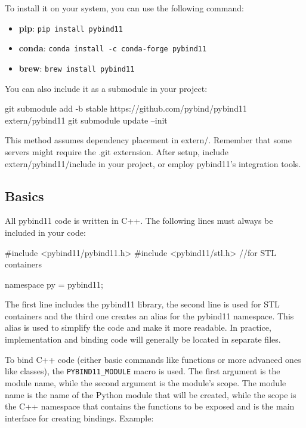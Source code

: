To install it on your system, you can use the following command:

\begin{itemize}
    \item \textbf{pip}: \phantom{wcoi} \texttt{pip install pybind11}

    \item \textbf{conda}: \phantom{w} \texttt{conda install -c conda-forge pybind11}

    \item \textbf{brew}: \phantom {da.} \texttt{brew install pybind11}

\end{itemize}

You can also include it as a submodule in your project:

\begin{codeblock}[language=bash]
git submodule add -b stable https://github.com/pybind/pybind11 extern/pybind11
git submodule update --init 
\end{codeblock}

This method assumes dependency placement in extern/. Remember that some servers might require the .git externsion.
After setup, include extern/pybind11/include in your project, or employ pybind11's integration tools.

\subsection{Basics}

All pybind11 code is written in C++. The following lines must always be included in your code:

\begin{codeblock}[language=C++]
#include <pybind11/pybind11.h> 
#include <pybind11/stl.h> //for STL containers

namespace py = pybind11;
\end{codeblock}

The first line includes the pybind11 library, the second line is used for STL containers and the third one creates an alias for the pybind11 namespace. This alias is used to simplify the code and make it more readable.
In practice, implementation and binding code will generally be located in separate files.

To bind C++ code (either basic commands like functions or more advanced ones like classes), the \texttt{PYBIND11\_MODULE} macro is used. The first argument is the module name, while the second argument is the module's scope. The module name is the name of the Python module that will be created, while the scope is the C++ namespace that contains the functions to be exposed and is the main interface for creating bindings.
Example:

